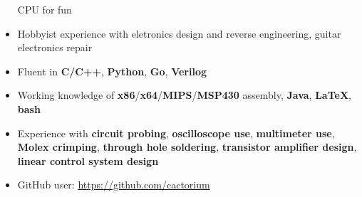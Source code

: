 \documentclass{my_resume}
\begin{document}
\begin{itemize}
        CPU for fun
    \item Hobbyist experience with eletronics design and reverse engineering, guitar electronics
        repair
    \item Fluent in \textbf{C/C++}, \textbf{Python}, \textbf{Go}, \textbf{Verilog}
	\item Working knowledge of \textbf{x86}/\textbf{x64}/\textbf{MIPS}/\textbf{MSP430} assembly,
            \textbf{Java}, \textbf{LaTeX}, \textbf{bash}
    \item Experience with \textbf{circuit probing}, \textbf{oscilloscope use},
            \textbf{multimeter use}, \textbf{Molex crimping},
            \textbf{through hole soldering}, \textbf{transistor amplifier design},
            \textbf{linear control system design}
    \item GitHub user: \url{https://github.com/cactorium}
\end{itemize}
\end{document}
